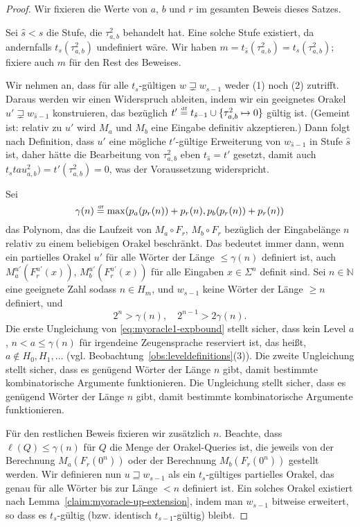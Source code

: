 \begin{proof}
Wir fixieren die Werte von $a$, $b$ und $r$ im gesamten Beweis dieses Satzes.

Sei $\hat{s} < s$ die Stufe, die $\tau^2_{a,b}$ behandelt hat.
Eine solche Stufe existiert, da andernfalls $t_{s}(\tau^2_{a,b})$ undefiniert wäre.
Wir haben $m = t_{\hat{s}}(\tau^2_{a,b}) = t_{s}(\tau^2_{a,b})$; fixiere auch $m$ für den Rest des Beweises.

Wir nehmen an, dass für alle $t_{s}$-gültigen $w\sqsupsetneq w_{s-1}$ weder (1) noch (2) zutrifft.
Daraus werden wir einen Widerspruch ableiten, indem wir ein geeignetes Orakel $u'\sqsupsetneq w_{\hat{s}-1}$ konstruieren, das bezüglich $t' \stackrel{\text{\smash{\tiny df}}}{=}  t_{\hat{s}-1}\cup \{\tau^2_{a,b}\mapsto 0\}$ gültig ist. (Gemeint ist: relativ zu $u'$ wird $M_a$ und $M_b$ eine Eingabe definitiv akzeptieren.)
Dann folgt nach Definition, dass $u'$ eine mögliche $t'$-gültige Erweiterung von $w_{\hat{s}-1}$ in Stufe $\hat{s}$ ist, daher hätte die Bearbeitung von $\tau^2_{a,b}$ eben $t_{\hat{s}}=t'$ gesetzt, damit auch $t_{s}tau^2_{a,b})=t'(\tau^2_{a,b})=0$, was der Voraussetzung widerspricht.

Sei
\begin{equation*} \gamma(n) \stackrel{\text{\smash{\tiny df}}}{=}  \max(p_a(p_r(n))+p_r(n), p_b(p_r(n))+p_r(n)) \end{equation*}
das Polynom, das die Laufzeit von $M_a\circ F_r$, $M_b\circ F_r$ bezüglich der Eingabelänge $n$ relativ zu einem beliebigen Orakel beschränkt.
Das bedeutet immer dann, wenn ein partielles Orakel $u'$ für alle Wörter der Länge $\leq \gamma(n)$ definiert ist, auch $M_a^{u'}(F_r^{u'}(x))$, $M_b^{u'}(F_r^{u'}(x))$ für alle Eingaben $x\in\Sigma^n$ definit sind.
Sei $n\in\mathbb N$ eine geeignete Zahl sodass $n\in H_m$, und $w_{s-1}$ keine Wörter der Länge $\geq n$ definiert,
und
\begin{equation}\label{eq:myoracle1-expbound}
    2^n > \gamma(n),\quad  2^{n-1} > 2\gamma(n).
\end{equation}
Die erste Ungleichung von \eqref{eq:myoracle1-expbound} stellt sicher, dass kein Level $a$, $n<a\leq \gamma(n)$ für irgendeine Zeugensprache reserviert ist, das heißt, $a\not\in H_0, H_1, \dots$ (vgl. Beobachtung~\ref{obs:leveldefinitions}(3)). Die zweite Ungleichung stellt sicher, dass es genügend Wörter der Länge $n$ gibt, damit bestimmte kombinatorische Argumente funktionieren.
Die Ungleichung stellt sicher, dass es genügend Wörter der Länge $n$ gibt, damit bestimmte kombinatorische Argumente funktionieren.

Für den restlichen Beweis fixieren wir zusätzlich $n$.
Beachte, dass $\ell(Q)\leq\gamma(n)$ für $Q$ die Menge der Orakel-Queries ist, die jeweils von der Berechnung $M_a(F_r(0^n))$ oder der Berechnung $M_b(F_r(0^n))$ gestellt werden.
Wir definieren nun $u\sqsupseteq w_{s-1}$ als ein $t_{s}$-gültiges partielles Orakel, das genau für alle Wörter bis zur Länge $<n$ definiert ist. Ein solches Orakel existiert nach Lemma~\ref{claim:myoracle-up-extension}, indem man $w_{s-1}$ bitweise erweitert, so dass es $t_{s}$-gültig (bzw. identisch $t_{s-1}$-gültig) bleibt.


\end{proof}
